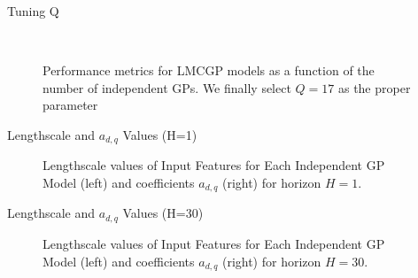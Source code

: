 \begin{frame}{Tuning Q}
	\begin{figure}[htbp]
	\centering
	\setlength{} 
	\setlength{}
	
	\subfloat[CRPS]{}\hspace{0.1em}
	\subfloat[MSE]{}\\
	\vspace{0.1em} %
	
	\subfloat[MSLL]{}\hspace{0.1em}
	\subfloat[NLPD]{}
	\caption{Performance metrics for LMCGP models as a function of the number of independent GPs. We finally select $Q=17$ as the proper parameter}
	\end{figure}
\end{frame}

\begin{frame}{Lengthscale and $a_{d,q}$ Values (H=1)}
	\begin{figure}[htbp]
		\centering
		\setlength{} 
		\setlength{}
		\subfloat[\label{fig:lmc_lengthscales}]{}\hspace{-0.8em}
		\subfloat[\label{fig:lmc_W_matrix}]{}
		\caption{Lengthscale values of Input Features for Each Independent GP Model (left) and coefficients $a_{d,q}$ (right) for horizon $H=1$.}
		\label{fig:lmc_parameters_h1} 
	\end{figure}
	
\end{frame}

\begin{frame}{Lengthscale and $a_{d,q}$ Values (H=30)}
	\begin{figure}[htbp]
		\setlength{} 
		\setlength{}
		\subfloat[\label{fig:lmc_lengthscales_h30}]{}\hspace{-0.8em}
		\subfloat[\label{fig:lmc_W_matrix_h30}]{}
		\caption{Lengthscale values of Input Features for Each Independent GP Model (left) and coefficients $a_{d,q}$ (right) for horizon $H=30$.}
		\label{fig:lmc_parameters_h30} 
	\end{figure}
\end{frame}


